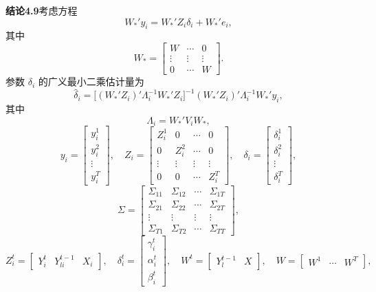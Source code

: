 \par\medskip\noindent\textbf{结论4.9}\quad 考虑方程
\begin{equation}
W_*'y_i=W_*'Z_i\delta_i+W_*'e_i,\tag{4.210}
\end{equation}
其中
\[
W_*=\begin{bmatrix}W&\cdots&0\\\vdots&\vdots&\vdots\\0&\cdots&W\end{bmatrix}.
\]
参数 $\delta_i$ 的广义最小二乘估计量为
\begin{equation}
\widehat\delta_i=
\bigl[(W_*'Z_i)'\Lambda_i^{-1}W_*'Z_i\bigr]^{-1}
(W_*'Z_i)'\Lambda_i^{-1}W_*'y_i,\tag{4.211}
\end{equation}
其中
\[
\Lambda_i=W_*'V_iW_*,
\]
\[
y_i=\begin{bmatrix}y_i^1\\y_i^2\\\vdots\\y_i^T\end{bmatrix},\quad
Z_i=\begin{bmatrix}
Z_i^1&0&\cdots&0\\0&Z_i^2&\cdots&0\\
\vdots&\vdots&\vdots&\vdots\\0&0&\cdots&Z_i^T
\end{bmatrix},\quad
\delta_i=\begin{bmatrix}\delta_i^1\\\delta_i^2\\\vdots\\\delta_i^T\end{bmatrix},
\]
\[
\Sigma=\begin{bmatrix}
\Sigma_{11}&\Sigma_{12}&\cdots&\Sigma_{1T}\\
\Sigma_{21}&\Sigma_{22}&\cdots&\Sigma_{2T}\\
\vdots&\vdots&\vdots&\vdots\\
\Sigma_{T1}&\Sigma_{T2}&\cdots&\Sigma_{TT}
\end{bmatrix},
\]
\[
Z_i^t=\begin{bmatrix}Y_i^t&Y_{li}^{t-1}&X_i\end{bmatrix},\quad
\delta_i^t=\begin{bmatrix}\gamma_i^t\\\alpha_i^t\\\beta_i^t\end{bmatrix},\quad
W^t=\begin{bmatrix}Y_l^{t-1}&X\end{bmatrix},\quad
W=\begin{bmatrix}W^1&\cdots&W^T\end{bmatrix},
\]
